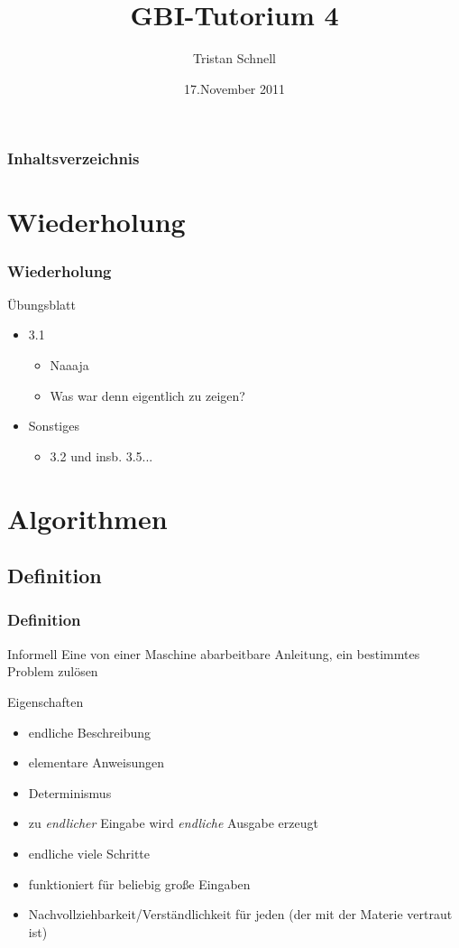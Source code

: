 \documentclass{beamer}
\author{Tristan Schnell}
\title{GBI-Tutorium 4}
\date{17.November 2011}
\begin{document}
\begin {frame}
	\titlepage
\end {frame}

\begin {frame}
	\frametitle {Inhaltsverzeichnis}
	\tableofcontents
\end {frame}

\section{Wiederholung}

\begin{frame}
	\frametitle{Wiederholung}
	\begin{block}{Übungsblatt}
		\begin{itemize}
			\item 3.1
				\begin{itemize}
					\item Naaaja
					\item Was war denn eigentlich zu zeigen?
				\end{itemize}
			\item Sonstiges
				\begin{itemize}
					\item 3.2 und insb. 3.5...
				\end{itemize}
		\end{itemize}
	\end{block}
\end{frame}

\section{Algorithmen}
\subsection{Definition}

\begin{frame}
	\frametitle{Definition}
	\begin{block}{Informell}
		Eine von einer Maschine abarbeitbare Anleitung, ein
		bestimmtes Problem zulösen
	\end{block}
	\begin{block}{Eigenschaften}
		\pause
		\begin{itemize}
 			 \item endliche Beschreibung
 			 \item elementare Anweisungen
 			 \item Determinismus
 			 \item zu \emph{endlicher} Eingabe wird \emph{endliche} Ausgabe erzeugt
 			 \item endliche viele Schritte
 			 \item funktioniert für beliebig große Eingaben
			  \item Nachvollziehbarkeit/Verständlichkeit für jeden (der mit der Materie
 			 vertraut ist)
		\end{itemize}
	\end{block}
\end{frame}
\end{document}
